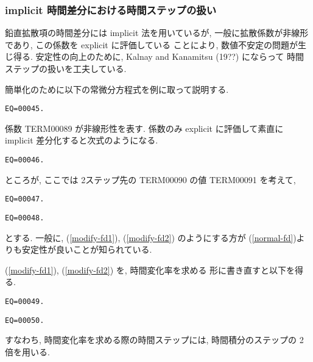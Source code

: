 \subsubsection{implicit 時間差分における時間ステップの扱い}

鉛直拡散項の時間差分には implicit 法を用いているが, 
一般に拡散係数が非線形であり, この係数を explicit に評価している
ことにより, 数値不安定の問題が生じ得る. 
安定性の向上のために, Kalnay and Kanamitsu (19??) にならって
時間ステップの扱いを工夫している. 

簡単化のために以下の常微分方程式を例に取って説明する. 
\begin{verbatim}
EQ=00045.
\end{verbatim}
係数 TERM00089 が非線形性を表す. 
係数のみ explicit に評価して素直に implicit 差分化すると次式のようになる. 
\begin{verbatim}
EQ=00046.
\end{verbatim}
ところが, ここでは 2ステップ先の TERM00090 の値 TERM00091 を考えて, 
\begin{verbatim}
EQ=00047.
\end{verbatim}
\begin{verbatim}
EQ=00048.
\end{verbatim}
とする. 
一般に, (\ref{modify-fd1}), (\ref{modify-fd2}) のようにする方が
(\ref{normal-fd})よりも安定性が良いことが知られている. 

(\ref{modify-fd1}), (\ref{modify-fd2}) を, 時間変化率を求める
形に書き直すと以下を得る. 
\begin{verbatim}
EQ=00049.
\end{verbatim}
\begin{verbatim}
EQ=00050.
\end{verbatim}
すなわち, 時間変化率を求める際の時間ステップには, 
時間積分のステップの 2 倍を用いる. 

